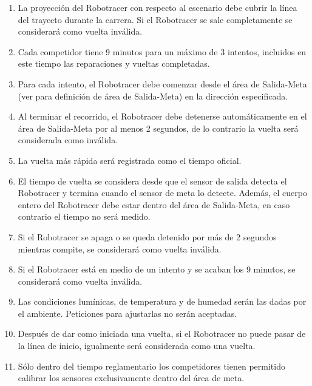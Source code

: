 \begin{enumerate}
  \item La proyección del Robotracer con respecto al escenario debe cubrir la línea del trayecto durante la carrera. Si el Robotracer se sale completamente se considerará como vuelta inválida.

  \item Cada competidor tiene 9 minutos para un máximo de 3 intentos, incluidos en este tiempo las reparaciones y vueltas completadas.

  \item Para cada intento, el Robotracer debe comenzar desde el área de Salida-Meta (ver  para definición de área de Salida-Meta) en la dirección especificada.

  \item Al terminar el recorrido, el Robotracer debe detenerse automáticamente en el área de Salida-Meta por al menos 2 segundos, de lo contrario la vuelta será considerada como inválida.

  \item La vuelta más rápida será registrada como el tiempo oficial.

  \item El tiempo de vuelta se considera desde que el sensor de salida detecta el Robotracer y termina cuando el sensor de meta lo detecte. Además, el cuerpo entero del Robotracer debe estar dentro del área de Salida-Meta, en caso contrario el tiempo no será medido.

  \item Si el Robotracer se apaga o se queda detenido por más de 2 segundos mientras compite, se considerará como vuelta inválida.

  \item Si el Robotracer está en medio de un intento y se acaban los 9 minutos, se considerará como vuelta inválida.

  \item Las condiciones lumínicas, de temperatura y de humedad serán las dadas por el ambiente. Peticiones para ajustarlas no serán aceptadas.

  \item Después de dar como iniciada una vuelta, si el Robotracer no puede pasar de la línea de inicio, igualmente será considerada como una vuelta.

  \item Sólo dentro del tiempo reglamentario los competidores tienen permitido calibrar los sensores exclusivamente dentro del área de meta.


\end{enumerate}
